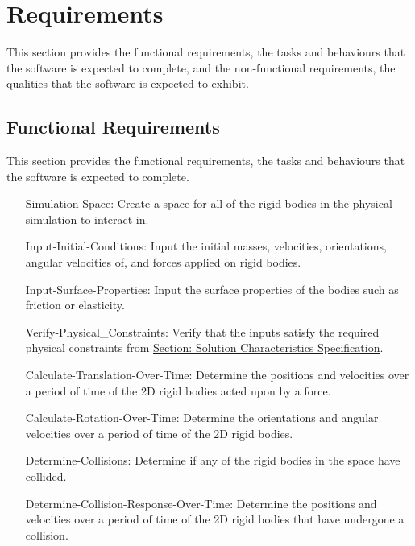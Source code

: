 \documentclass[12pt]{article}
\begin{document}
\section{Requirements}
\label{Sec:Requirements}
This section provides the functional requirements, the tasks and behaviours that the software is expected to complete, and the non-functional requirements, the qualities that the software is expected to exhibit.
\subsection{Functional Requirements}
\label{Sec:FRs}
This section provides the functional requirements, the tasks and behaviours that the software is expected to complete.
\begin{itemize}
\item[Simulation-Space:\phantomsection\label{simSpace}]Create a space for all of the rigid bodies in the physical simulation to interact in.
\item[Input-Initial-Conditions:\phantomsection\label{inputInitialConds}]Input the initial masses, velocities, orientations, angular velocities of, and forces applied on rigid bodies.
\item[Input-Surface-Properties:\phantomsection\label{inputSurfaceProps}]Input the surface properties of the bodies such as friction or elasticity.
\item[Verify-Physical\_Constraints:\phantomsection\label{verifyPhysCons}]Verify that the inputs satisfy the required physical constraints from \hyperref[Sec:SolCharSpec]{Section: Solution Characteristics Specification}.
\item[Calculate-Translation-Over-Time:\phantomsection\label{calcTransOverTime}]Determine the positions and velocities over a period of time of the 2D rigid bodies acted upon by a force.
\item[Calculate-Rotation-Over-Time:\phantomsection\label{calcRotOverTime}]Determine the orientations and angular velocities over a period of time of the 2D rigid bodies.
\item[Determine-Collisions:\phantomsection\label{deterColls}]Determine if any of the rigid bodies in the space have collided.
\item[Determine-Collision-Response-Over-Time:\phantomsection\label{deterCollRespOverTime}]Determine the positions and velocities over a period of time of the 2D rigid bodies that have undergone a collision.
\end{itemize}
\end{document}
